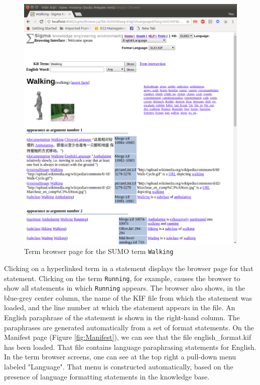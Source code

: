 \documentclass{book}
\begin{document}
\begin{figure}
  \centering
  \includegraphics[width=4.5in]{pictures/Walking.png}
  \caption{Term browser page for the SUMO term {\tt Walking}}
  \label{fig:Walking}
\end{figure}

Clicking on a hyperlinked term in a statement displays the browser page for that
statement.  Clicking on the term \texttt{Running}, for example, causes the browser to
show all statements in which \texttt{Running} appears.  The browser also shows, in the
blue-grey center column, the name of the KIF file from which the statement was
loaded, and the line number at which the statement appears in the file.  An
English paraphrase of the statement is shown in the right-hand column.  The
paraphrases are generated automatically from a set of format statements.  On the
Manifest page (Figure \ref{fig:Manifest}), we can see that the
file english_format.kif has been loaded.  That file contains language
paraphrasing statements for English.  In the term browser screens, one can see
at the top right a pull-down menu labeled "Language".  That menu is constructed
automatically, based on the presence of language formatting statements in the
knowledge base.
\end{document}
